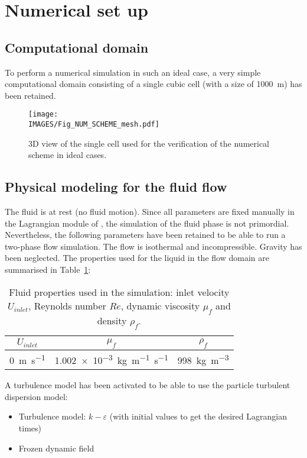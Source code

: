 
\section{Numerical set up}
\subsection{Computational domain}
To perform a numerical simulation in such an ideal case, a very simple computational domain consisting of a single cubic cell (with a size of \SI{1000}{m}) has been retained.

\begin{figure}[H]
 \centering
 \texttt{[image: \\IMAGES/Fig\_NUM\_SCHEME\_mesh.pdf]}
 \caption{3D view of the single cell used for the verification of the numerical scheme in ideal cases.}
 \label{Fig_NUM_SCHEME_Verif_mesh}
\end{figure}

%
\subsection{Physical modeling for the fluid flow}
The fluid is at rest (no fluid motion).
Since all parameters are fixed manually in the Lagrangian module of \CS{}, the simulation of the fluid phase is not primordial. Nevertheless, the following parameters have been retained to be able to run a two-phase flow simulation. The flow is isothermal and incompressible. Gravity has been neglected. The properties used for the liquid in the flow domain are summarised in Table~\ref{Tab_NUM_SCHEME_fluid}:
\begin{table}[H]
\begin{center}
\begin{tabular}{|c|c|c|}
\hline
$U_{inlet}$ & $\mu_f$ 			& $\rho_f$ 		\\
\hline
\SI{0}{m.s^{-1}} & \SI{1.002e-3}{kg.m^{-1}.s^{-1}} 	& \SI{998}{kg.m^{-3}}	\\
\hline
\end{tabular}
 \caption{Fluid properties used in the simulation: inlet velocity $U_{inlet}$, Reynolds number $Re$, dynamic viscosity $\mu_f$ and density $\rho_f$.}
\label{Tab_NUM_SCHEME_fluid}
\end{center}
\end{table}

A turbulence model has been activated to be able to use the particle turbulent dispersion model:
\begin{itemize}
 \item Turbulence model: $k-\varepsilon$ (with initial values to get the desired Lagrangian times)
 \item Frozen dynamic field
\end{itemize}


